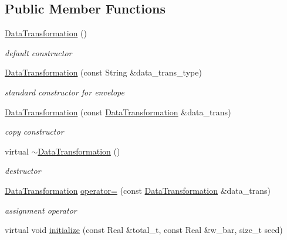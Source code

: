 \subsection*{Public Member Functions}
\begin{DoxyCompactItemize}
\item 
\hyperlink{classPecos_1_1DataTransformation_ac6edfcdb46b6e07c9bdd6869ea407ad8}{Data\+Transformation} ()
\begin{DoxyCompactList}\small\item\em default constructor \end{DoxyCompactList}\item 
\hyperlink{classPecos_1_1DataTransformation_a58ce1cb41e61bc30ebbcc3a80b7a75c6}{Data\+Transformation} (const String \&data\+\_\+trans\+\_\+type)
\begin{DoxyCompactList}\small\item\em standard constructor for envelope \end{DoxyCompactList}\item 
\hyperlink{classPecos_1_1DataTransformation_ad6aff7a1529d9c7b8805587d7ec80a24}{Data\+Transformation} (const \hyperlink{classPecos_1_1DataTransformation}{Data\+Transformation} \&data\+\_\+trans)
\begin{DoxyCompactList}\small\item\em copy constructor \end{DoxyCompactList}\item 
virtual \hyperlink{classPecos_1_1DataTransformation_a11731ed3d0ac8be4aafdbc9b18d84aba}{$\sim$\+Data\+Transformation} ()
\begin{DoxyCompactList}\small\item\em destructor \end{DoxyCompactList}\item 
\hyperlink{classPecos_1_1DataTransformation}{Data\+Transformation} \hyperlink{classPecos_1_1DataTransformation_af090d7f211241ad41f7269f5e653d83c}{operator=} (const \hyperlink{classPecos_1_1DataTransformation}{Data\+Transformation} \&data\+\_\+trans)
\begin{DoxyCompactList}\small\item\em assignment operator \end{DoxyCompactList}\item 
virtual void \hyperlink{classPecos_1_1DataTransformation_aff7310eaa8322a3eccf9815cc7da4a8e}{initialize} (const Real \&total\+\_\+t, const Real \&w\+\_\+bar, size\+\_\+t seed)\label{classPecos_1_1DataTransformation_aff7310eaa8322a3eccf9815cc7da4a8e}


\end{DoxyCompactItemize}
